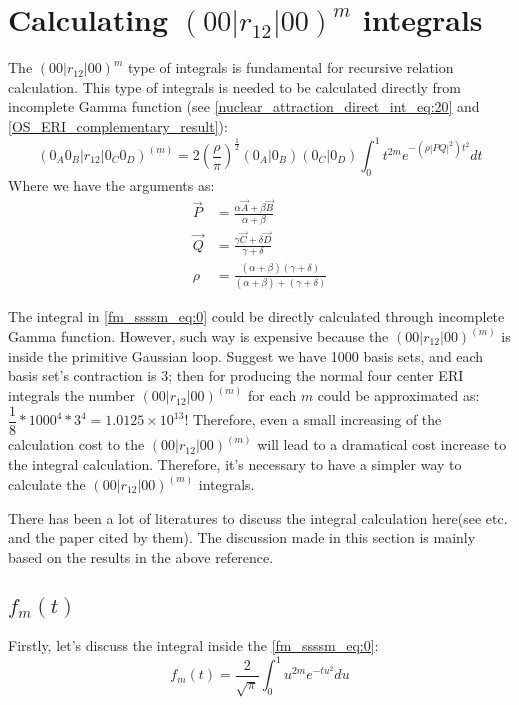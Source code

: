 %
%
\section{Calculating $(00|r_{12}|00)^{m}$ integrals}
%
%
The $(00|r_{12}|00)^{m}$ type of integrals is fundamental
for recursive relation calculation. This type of integrals
is needed to be calculated directly from incomplete Gamma 
function (see \ref{nuclear_attraction_direct_int_eq:20} and 
\ref{OS_ERI_complementary_result}):
\begin{equation}
 (0_{A}0_{B}|r_{12}|0_{C}0_{D})^{(m)} = 
 2\left( \frac{\rho}{\pi}\right)^{\frac{1}{2}}(0_{A}|0_{B})
(0_{C}|0_{D})\int^{1}_{0} t^{2m} e^{-(\rho|PQ|^{2})t^{2}} dt 
\label{fm_ssssm_eq:0}
\end{equation}
Where we have the arguments as:
\begin{align}
 \overrightarrow{P} &= \frac{\alpha \overrightarrow{A} + \beta
\overrightarrow{B}}{\alpha + \beta} \nonumber \\
\overrightarrow{Q} &= \frac{\gamma \overrightarrow{C} + \delta
\overrightarrow{D}}{\gamma + \delta} \nonumber \\
\rho &= \frac{(\alpha+\beta)(\gamma + \delta)}
{(\alpha+\beta)+(\gamma + \delta)}
\end{align}

The integral in \ref{fm_ssssm_eq:0} could be directly calculated through
incomplete Gamma function. However, such way is expensive because the 
$(00|r_{12}|00)^{(m)}$ is inside the primitive Gaussian loop. Suggest
we have 1000 basis sets, and each basis set's contraction is 3; then
for producing the normal four center ERI integrals the number $(00|r_{12}|00)^{(m)}$
for each $m$ could be approximated as: $\dfrac{1}{8}*1000^{4}*3^{4} = 
1.0125\times 10^{13}$! Therefore, even a small increasing of the calculation
cost to the $(00|r_{12}|00)^{(m)}$ will lead to a dramatical cost increase
to the integral calculation. Therefore, it's necessary to have a simpler
way to calculate the $(00|r_{12}|00)^{(m)}$ integrals.

There has been a lot of literatures to discuss the integral calculation here(see 
\cite{harris1983sssm, gill1991two} etc. and the paper cited by them). The discussion
made in this section is mainly based on the results in the above reference.

\subsection{$f_{m}(t)$}
\label{fmt_function_assessment}
%
%
Firstly, let's discuss the integral inside the \ref{fm_ssssm_eq:0}:
\begin{equation}\label{fm_ssssm_fmt_eq:1}
 f_{m}(t) = \frac{2}{\sqrt{\pi}}\int^{1}_{0} u^{2m} e^{-tu^{2}} du 
\end{equation}


